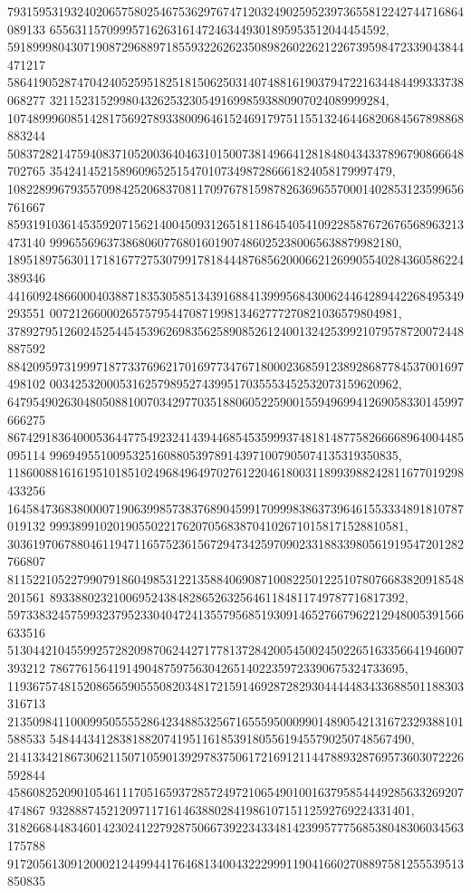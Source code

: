 \documentclass[12pt]{article}
\begin{document}
793159531932402065758025467536297674712032490259523973655812242744716864089133
65563115709995716263161472463449301895953512044454592, 
591899980430719087296889718559322626235089826022621226739598472339043844471217
586419052874704240525951825181506250314074881619037947221634484499333738068277
32115231529980432625323054916998593880907024089999284, 
107489996085142817569278933800964615246917975115513246446820684567898868883244
508372821475940837105200364046310150073814966412818480434337896790866648702765
354241452158960965251547010734987286661824058179997479, 
108228996793557098425206837081170976781598782636965570001402853123599656761667
859319103614535920715621400450931265181186454054109228587672676568963213473140
9996556963738680607768016019074860252380065638879982180, 
189518975630117181677275307991781844487685620006621269905540284360586224389346
441609248660004038871835305851343916884139995684300624464289442268495349293551
0072126600026575795447087199813462777270821036579804981, 
378927951260245254454539626983562589085261240013242539921079578720072448887592
884209597319997187733769621701697734767180002368591238928687784537001697498102
0034253200053162579895274399517035553452532073159620962, 
647954902630480508810070342977035188060522590015594969941269058330145997666275
867429183640005364477549232414394468545359993748181487758266668964004485095114
9969495510095325160880539789143971007905074135319350835, 
118600881616195101851024968496497027612204618003118993988242811677019298433256
164584736838000071906399857383768904599170999838637396461553334891810787019132
99938991020190550221762070568387041026710158171528810581, 
303619706788046119471165752361567294734259709023318833980561919547201282766807
811522105227990791860498531221358840690871008225012251078076683820918548201561
89338802321006952438482865263256461184811749787716817392, 
597338324575993237952330404724135579568519309146527667962212948005391566633516
513044210455992572820987062442717781372842005450024502265163356641946007393212
78677615641914904875975630426514022359723390675324733695, 
119367574815208656590555082034817215914692872829304444483433688501188303316713
213509841100099505555286423488532567165559500099014890542131672329388101588533
548444341283818820741951161853918055619455790250748567490, 
214133421867306211507105901392978375061721691211447889328769573603072226592844
458608252090105461117051659372857249721065490100163795854449285633269207474867
932888745212097117161463880284198610715112592769224331401, 
318266844834601423024122792875066739223433481423995777568538048306034563175788
917205613091200021244994417646813400432229991190416602708897581255539513850835
\end{document}

